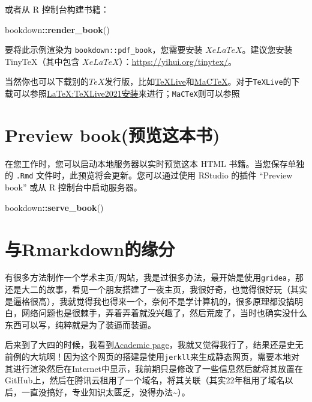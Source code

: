 \documentclass[
]{book}
\newenvironment{Shaded}{\begin{snugshade}}{\end{snugshade}}
\newcommand{\FunctionTok}[1]{\textcolor[rgb]{0.13,0.29,0.53}{\textbf{#1}}}
\newcommand{\NormalTok}[1]{#1}
\newcommand{\SpecialCharTok}[1]{\textcolor[rgb]{0.81,0.36,0.00}{\textbf{#1}}}
\theoremstyle{definition}
\theoremstyle{definition}
\theoremstyle{definition}
\theoremstyle{definition}
\theoremstyle{remark}
\begin{document}
或者从 R 控制台构建书籍：

\begin{Shaded}
\begin{Highlighting}[]
\NormalTok{bookdown}\SpecialCharTok{::}\FunctionTok{render\_book}\NormalTok{()}
\end{Highlighting}
\end{Shaded}

要将此示例渲染为 \texttt{bookdown::pdf\_book}，您需要安装 \(XeLaTeX\)。建议您安装 TinyTeX（其中包含 \(XeLaTeX\)）：\url{https://yihui.org/tinytex/}。

当然你也可以下载别的\(TeX\)发行版，比如\href{https://tug.org/texlive/}{TeXLive}和\href{https://tug.org/mactex/}{MaCTeX}。对于\texttt{TeXLive}的下载可以参照\href{https://zhuanlan.zhihu.com/p/362201376}{LaTeX:TeXLive2021安装}来进行；\texttt{MaCTeX}则可以参照\href{}{}

\hypertarget{preview-bookux9884ux89c8ux8fd9ux672cux4e66}{%
\section{Preview book(预览这本书)}\label{preview-bookux9884ux89c8ux8fd9ux672cux4e66}}

在您工作时，您可以启动本地服务器以实时预览这本 HTML 书籍。当您保存单独的 \texttt{.Rmd} 文件时，此预览将会更新。您可以通过使用 RStudio 的插件 ``Preview book'' 或从 R 控制台中启动服务器。

\begin{Shaded}
\begin{Highlighting}[]
\NormalTok{bookdown}\SpecialCharTok{::}\FunctionTok{serve\_book}\NormalTok{()}
\end{Highlighting}
\end{Shaded}

\hypertarget{ux4e0ermarkdownux7684ux7f18ux5206}{%
\section{与Rmarkdown的缘分}\label{ux4e0ermarkdownux7684ux7f18ux5206}}

有很多方法制作一个学术主页/网站，我是过很多办法，最开始是使用\texttt{gridea}，那还是大二的故事，看见一个朋友搭建了一夜主页，我很好奇，也觉得很好玩（其实是逼格很高），我就觉得我也得来一个，奈何不是学计算机的，很多原理都没搞明白，网络问题也是很棘手，弄着弄着就没兴趣了，然后荒废了，当时也确实没什么东西可以写，纯粹就是为了装逼而装逼。

后来到了大四的时候，我看到\href{https://academicpages.github.io/}{Academic page}，我就又觉得我行了，结果还是史无前例的大坑啊！因为这个网页的搭建是使用\texttt{jerkll}来生成静态网页，需要本地对其进行渲染然后在Internet中显示，我前期只是修改了一些信息然后就将其放置在GitHub上，然后在腾讯云租用了一个域名，将其关联（其实22年租用了域名以后，一直没搞好，专业知识太匮乏，没得办法\textasciitilde）。
\end{document}
